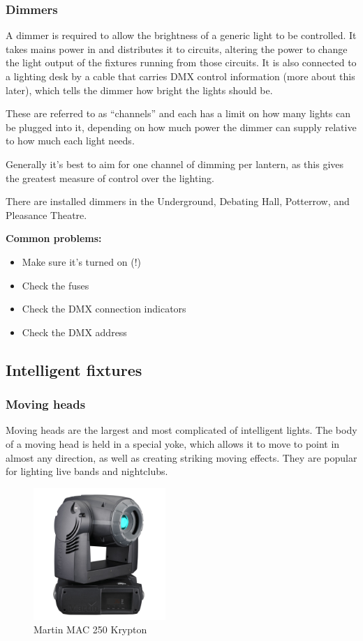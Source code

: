 \documentclass[14pt]{article} %
\begin{document}
\subsubsection{Dimmers}
A dimmer is required to allow the brightness of a generic light to be controlled. It takes mains power in and distributes it to circuits, altering the power to change the light output of the fixtures running from those circuits. It is also connected to a lighting desk by a cable that carries DMX control information (more about this later), which tells the dimmer how bright the lights should be. 

These are referred to as “channels” and each has a limit on how many lights can be plugged into it, depending on how much power the dimmer can supply relative to how much each light needs.

Generally it’s best to aim for one channel of dimming per lantern, as this gives the greatest measure of control over the lighting.

There are installed dimmers in the Underground, Debating Hall, Potterrow, and Pleasance Theatre.

\textbf{Common problems:}
\begin{itemize}
\item	Make sure it’s turned on (!)
\item	Check the fuses
\item	Check the DMX connection indicators
\item	Check the DMX address
\end{itemize}

\subsection{Intelligent fixtures}

\subsubsection{Moving heads}

Moving heads are the largest and most complicated of intelligent lights. The body of a moving head is held in a special yoke, which allows it to move to point in almost any direction, as well as creating striking moving effects.	They are popular for lighting live bands and nightclubs.

\begin{figure}[h]
\begin{center}

\includegraphics[height=5cm]{mac250krypton.jpg}
\caption{Martin MAC 250 Krypton}
\label{fig:krypton}

\end{center}
\end{figure}
\end{document}
